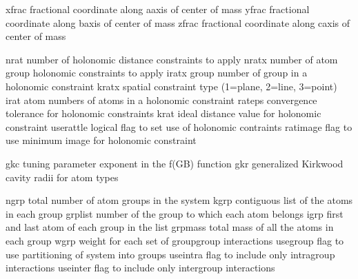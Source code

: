 \documentclass[letterpaper,11pt,english]{sphinxmanual}
\begin{document}

\begin{sphinxVerbatim}[commandchars=\\\{\}]
xfrac           fractional coordinate along a\PYGZhy{}axis of center of mass
yfrac           fractional coordinate along b\PYGZhy{}axis of center of mass
zfrac           fractional coordinate along c\PYGZhy{}axis of center of mass
\end{sphinxVerbatim}


\begin{sphinxVerbatim}[commandchars=\\\{\}]
nrat            number of holonomic distance constraints to apply
nratx           number of atom group holonomic constraints to apply
iratx           group number of group in a holonomic constraint
kratx           spatial constraint type (1=plane, 2=line, 3=point)
irat            atom numbers of atoms in a holonomic constraint
rateps          convergence tolerance for holonomic constraints
krat            ideal distance value for holonomic constraint
use\PYGZus{}rattle      logical flag to set use of holonomic contraints
ratimage        flag to use minimum image for holonomic constraint
\end{sphinxVerbatim}


\begin{sphinxVerbatim}[commandchars=\\\{\}]
gkc             tuning parameter exponent in the f(GB) function
gkr             generalized Kirkwood cavity radii for atom types
\end{sphinxVerbatim}


\begin{sphinxVerbatim}[commandchars=\\\{\}]
ngrp            total number of atom groups in the system
kgrp            contiguous list of the atoms in each group
grplist         number of the group to which each atom belongs
igrp            first and last atom of each group in the list
grpmass         total mass of all the atoms in each group
wgrp            weight for each set of group\PYGZhy{}group interactions
use\PYGZus{}group       flag to use partitioning of system into groups
use\PYGZus{}intra       flag to include only intragroup interactions
use\PYGZus{}inter       flag to include only intergroup interactions
\end{sphinxVerbatim}
\end{document}
